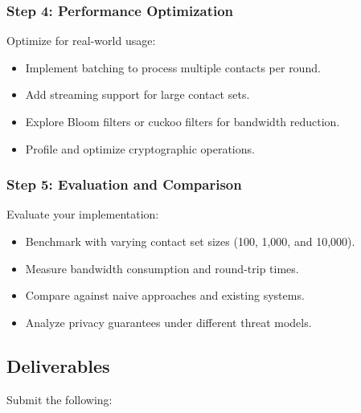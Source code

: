\documentclass[10pt,a4paper,american]{exam}
\begin{document}
\subsubsection*{Step 4: Performance Optimization}
Optimize for real-world usage:
\begin{itemize}
	\item Implement batching to process multiple contacts per round.
	\item Add streaming support for large contact sets.
	\item Explore Bloom filters or cuckoo filters for bandwidth reduction.
	\item Profile and optimize cryptographic operations.
\end{itemize}

\subsubsection*{Step 5: Evaluation and Comparison}
Evaluate your implementation:
\begin{itemize}
	\item Benchmark with varying contact set sizes (100, 1,000, and 10,000).
	\item Measure bandwidth consumption and round-trip times.
	\item Compare against naive approaches and existing systems.
	\item Analyze privacy guarantees under different threat models.
\end{itemize}

\subsection*{Deliverables}
Submit the following:
\end{document}
